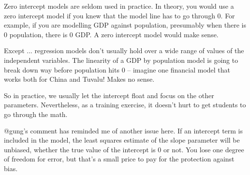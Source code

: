 
Zero intercept models are seldom used in practice. In theory, you would use a zero intercept model if you knew that the model line has to go through 0. For example, if you are modelling GDP against population, presumably when there is 0 population, there is 0 GDP. A zero intercept model would make sense.

Except ... regression models don't usually hold over a wide range of values of the independent variables. The linearity of a GDP by population model is going to break down way before population hits 0 -- imagine one financial model that works both for China and Tuvalu! Makes no sense.

So in practice, we usually let the intercept float and focus on the other parameters. Nevertheless, as a training exercise, it doesn't hurt to get students to go through the math.

@gung's comment has reminded me of another issue here. If an intercept term is included in the model, the least squares estimate of the slope parameter will be unbiased, whether the true value of the intercept is 0 or not. You lose one degree of freedom for error, but that's a small price to pay for the protection against bias.

